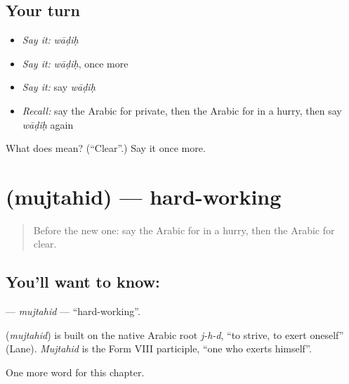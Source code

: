 \subsection*{Your turn}
\begin{itemize}
\raggedright
  \item \emph{Say it:} \emph{wāḍiḥ}
  \item \emph{Say it:} \emph{wāḍiḥ}, once more
  \item \emph{Say it:} say \emph{wāḍiḥ}
  \item \emph{Recall:} say the Arabic for private, then the Arabic for in a hurry, then say \emph{wāḍiḥ} again
\end{itemize}

\begin{tcolorbox}[breakable,colback=teal!4,colframe=teal!35!black,title={Before you move on}]
What does  mean? (\textquotedblleft{}Clear\textquotedblright{}.) Say it once more.
\end{tcolorbox}
\section[\texorpdfstring{\ar{مجتهد} (mujtahid)}{مجتهد (mujtahid)}]{ (mujtahid) — hard-working}

\label{lesson:AR-C178-mujtahid}



\begin{quote}
Before the new one: say the Arabic for in a hurry, then the Arabic for clear.
\end{quote}

\subsection*{You'll want to know: }
\textbf{} — \emph{mujtahid} — \textquotedblleft{}hard-working\textquotedblright{}.

\begin{cousinweb}
\textbf{} (\emph{mujtahid}) is built on the native Arabic root \emph{j-h-d}, \textquotedblleft{}to strive, to exert oneself\textquotedblright{} (Lane). \emph{Mujtahid} is the Form VIII participle, \textquotedblleft{}one who exerts himself\textquotedblright{}.
\end{cousinweb}

\begin{grammarlens}[title={What you've built}]
One more word for this chapter.
\end{grammarlens}

